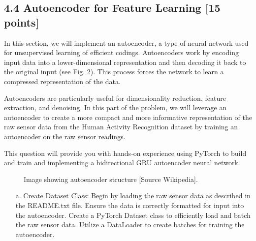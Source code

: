 \documentclass[a3paper,12pt]{extarticle} %
\begin{document}
\begin{enumerate}
\subsection*{4.4 Autoencoder for Feature Learning [15 points]}
In this section, we will implement an autoencoder, a type of neural network used for unsupervised learning of efficient codings. Autoencoders work by encoding input data into a lower-dimensional representation and then decoding it back to the original input (see Fig. 2). This process forces the network to learn a compressed representation of the data.

Autoencoders are particularly useful for dimensionality reduction, feature extraction, and denoising. In this part of the problem, we will leverage an autoencoder to create a more compact and more informative representation of the raw sensor data from the Human Activity Recognition dataset by training an autoencoder on the raw sensor readings.

This question will provide you with hands-on experience using PyTorch to build and train and implementing a bidirectional GRU autoencoder neural network.

\begin{figure}[h]
\centering
\caption{Image showing autoencoder structure [Source Wikipedia].}
\end{figure}

\begin{itemize}
\item[a.] Create Dataset Class: Begin by loading the raw sensor data as described in the README.txt file. Ensure the data is correctly formatted for input into the autoencoder. Create a PyTorch Dataset class to efficiently load and batch the raw sensor data. Utilize a DataLoader to create batches for training the autoencoder.


\end{itemize}
\end{enumerate}
\end{document}
